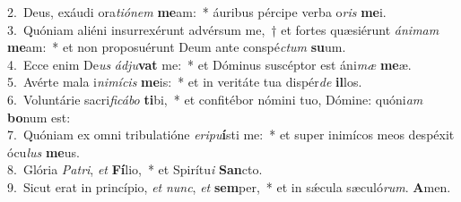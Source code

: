 {2.~}Deus, exáudi ora\textit{ti}\textit{ó}\textit{nem} \textbf{me}am:~* áuribus pércipe verba o\textit{ris} \textbf{me}i.\\
{3.~}Quóniam aliéni insurrexérunt advérsum me,~† et fortes quæsiérunt \textit{á}\textit{ni}\textit{mam} \textbf{me}am:~* et non proposuérunt Deum ante conspé\textit{ctum} \textbf{su}um.\\
{4.~}Ecce enim De\textit{us} \textit{ád}\textit{ju}\textbf{vat} me:~* et Dóminus suscéptor est áni\textit{mæ} \textbf{me}æ.\\
{5.~}Avérte mala i\textit{ni}\textit{mí}\textit{cis} \textbf{me}is:~* et in veritáte tua dispér\textit{de} \textbf{il}los.\\
{6.~}Voluntárie sacri\textit{fi}\textit{cá}\textit{bo} \textbf{ti}bi,~* et confitébor nómini tuo, Dómine: quóni\textit{am} \textbf{bo}num est:\\
{7.~}Quóniam ex omni tribulatióne \textit{e}\textit{ri}\textit{pu}\textbf{í}sti me:~* et super inimícos meos despéxit ócu\textit{lus} \textbf{me}us.\\
{8.~}Glória \textit{Pa}\textit{tri}, \textit{et} \textbf{Fí}lio,~* et Spirítu\textit{i} \textbf{San}cto.\\
{9.~}Sicut erat in princípio, \textit{et} \textit{nunc}, \textit{et} \textbf{sem}per,~* et in sǽcula sæculó\textit{rum}. \textbf{A}men.\\
